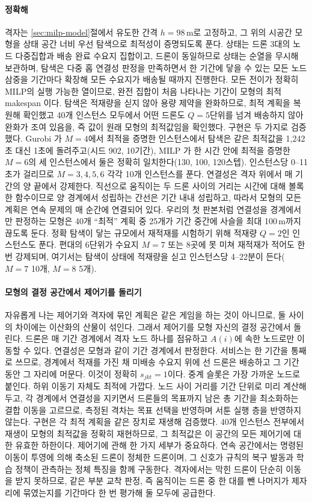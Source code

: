 \documentclass[final,5p,times,twocolumn]{elsarticle}
\begin{document}
\paragraph{정확해}
격자는 \ref{sec:milp-model}절에서 유도한 간격 $h = 98$\,m로 고정하고, 그 위의 시공간 모형을 상태
공간 너비 우선 탐색으로 최적성이 증명되도록 푼다. 상태는 드론 3대의 노드 다중집합과 배송 완료
수요지 집합이고, 드론이 동일하므로 상태는 순열을 무시해 보관하며, 탐색은 다중 홉 연결성 판정을
만족하면서 한 기간에 닿을 수 있는 모든 노드 삼중을 기간마다 확장해 모든 수요지가 배송될 때까지
진행한다. 모든 전이가 정확히 MILP의 실행 가능한 열이므로, 완전 집합이 처음 나타나는 기간이 모형의
최적 makespan 이다. 탐색은 적재량을 싣지 않아 용량 제약을 완화하므로, 최적 계획을 복원해 확인했고
40개 인스턴스 모두에서 어떤 드론도 $Q = 5$단위를 넘겨 배송하지 않아 완화가 조여 있음을, 즉 값이
원래 모형의 최적값임을 확인했다. 구현은 두 가지로 검증했다. Gurobi 가 $M = 4$에서 최적을 증명한
인스턴스에서 탐색은 같은 최적값을 1{,}242초 대신 1초에 돌려주고(시드 902, 10기간), MILP 가 한 시간
안에 최적을 증명한 $M = 6$의 세 인스턴스에서 둘은 정확히 일치한다(130, 100, 120스텝). 인스턴스당
0--11초가 걸리므로 $M = 3, 4, 5, 6$ 각각 10개 인스턴스를 푼다.
연결성은 격자 위에서 매 기간의 양 끝에서 강제한다. 직선으로 움직이는 두 드론 사이의 거리는 시간에
대해 볼록한 함수이므로 양 경계에서 성립하는 간선은 기간 내내 성립하고, 따라서 모형의 모든 계획은
연속 문제의 매 순간에 연결되어 있다. 우리의 첫 판본처럼 연결성을 경계에서만 판정하는 모형은 40개
``최적'' 계획 중 25개가 기간 중간에 사슬을 최대 100\,m까지 끊도록 둔다. 정확 탐색이 닿는 규모에서
재적재를 시험하기 위해 적재량 $Q = 2$인 인스턴스도 푼다. 편대의 6단위가 수요지 $M = 7$ 또는 $8$곳에
못 미쳐 재적재가 적어도 한 번 강제되며, 여기서는 탐색이 상태에 적재량을 싣고 인스턴스당 4--22분이
든다($M = 7$ 10개, $M = 8$ 5개).

\paragraph{모형의 결정 공간에서 제어기를 돌리기}
자유롭게 나는 제어기와 격자에 묶인 계획은 같은 게임을 하는 것이 아니므로, 둘 사이의 차이에는
이산화의 산물이 섞인다. 그래서 제어기를 모형 자신의 결정 공간에서 돌린다. 드론은 매 기간 경계에서
격자 노드 하나를 점유하고 $A(i)$에 속한 노드로만 이동할 수 있다. 연결성은 모형과 같이 기간
경계에서 판정한다. 서비스는 한 기간을 통째로 쓰므로, 경계에서 적재를 가진 채 미배송 수요지 위에 선
드론은 배송하고 그 기간 동안 그 자리에 머문다. 이것이 정확히 $s_{jkt}=1$이다. 중계 슬롯은 가장
가까운 노드로 붙인다. 하위 이동기 자체도 최적에 가깝다. 노드 사이 거리를 기간 단위로 미리 계산해
두고, 각 경계에서 연결성을 지키면서 드론들의 목표까지 남은 총 기간을 최소화하는 결합 이동을 고르므로,
측정된 격차는 목표 선택을 반영하며 서툰 실행 층을 반영하지 않는다. 구현은 각 최적 계획을 같은
장치로 재생해 검증했다. 40개 인스턴스 전부에서 재생이 모형의 최적값을 정확히 재현하므로, 그
최적값은 이 공간의 모든 제어기에 대한 유효한 하한이다. 제어기에 관해 한 가지 세부가 중요하다.
연속 공간에서는 명령된 이동이 투영에 의해 축소된 드론이 정체한 드론이며, 그 신호가 규칙의 복구
발동과 학습 정책이 관측하는 정체 특징을 함께 구동한다. 격자에서는 막힌 드론이 단순히 이동을 받지
못하므로, 같은 부분 교착 판정, 즉 움직이는 드론 중 한 대를 뺀 나머지가 제자리에 묶였는지를 기간마다
한 번 평가해 둘 모두에 공급한다.
\end{document}
